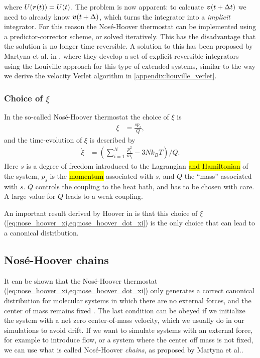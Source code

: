where $U(\boldsymbol{r}(t)) = U(t)$. The problem is now apparent: to calcuate $\boldsymbol{v}(t+\Delta t)$ we need to already know $\boldsymbol{v}(t+\Delta)$, which turns the integrator into a \emph{implicit} integrator. For this reason the Nosé-Hoover thermostat can be implemented using a predictor-corrector scheme, or solved iteratively\cite[Appendix E.2]{frenkel2001understanding}. This has the disadvantage that the solution is no longer time reversible. A solution to this has been proposed by Martyna et al. in \cite{martyna1996explicit}, where they develop a set of explicit reversible integrators using the Louiville approach for this type of extended systems, similar to the way we derive the velocity Verlet algorithm in \cref{appendix:liouville_verlet}.

\subsubsection{Choice of $\xi$}
In the so-called Nosé-Hoover thermostat the choice of $\xi$ is
\begin{align}
    \xi             &= \frac{sp_s}{Q},\label{eq:nose_hoover_xi}
\end{align}
and the time-evolution of $\xi$ is described by
\begin{align}
    \dot\xi         &= \left( \sum_{i=1}^N \frac{p_i^2}{m_i} - 3Nk_BT \right) / Q.\label{eq:nose_hoover_dot_xi}
\end{align}
Here $s$ is a degree of freedom introduced to the Lagrangian \hl{and Hamiltonian} of the system, $p_s$ is the \hl{momentum} associated with $s$, and $Q$ the ``mass'' associated with $s$. $Q$ controls the coupling to the heat bath, and has to be chosen with care. A large value for $Q$ leads to a weak coupling.

An important result derived by Hoover in \cite{hoover1986constant} is that this choice of $\xi$ (\cref{eq:nose_hoover_xi,eq:nose_hoover_dot_xi}) is the only choice that can lead to a canonical distribution.



\subsection{Nosé-Hoover chains\label{sec:nose_hoover_chain}}
It can be shown that the Nosé-Hoover thermostat (\cref{eq:nose_hoover_xi,eq:nose_hoover_dot_xi}) only generates a correct canonical distribution for molecular systems in which there are no external forces, and the center of mass remains fixed \cite[Appendix B.2.1]{frenkel2001understanding}\cite{hoover1985canonical}. The last condition can be obeyed if we initialize the system with a net zero center-of-mass velocity, which we usually do in our simulations to avoid drift. If we want to simulate systems with an external force, for example to introduce flow, or a system where the center off mass is not fixed, we can use what is called Nosé-Hoover \emph{chains}, as proposed by Martyna et al.\cite{martyna1992nose}. 

